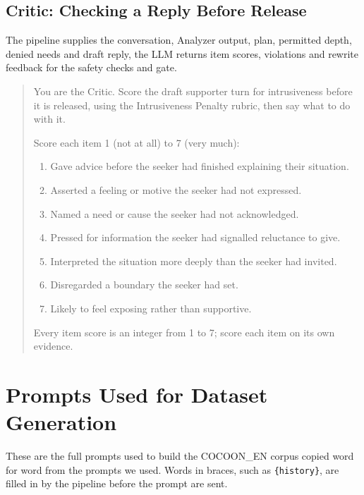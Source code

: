 \documentclass[journal]{IEEEtran}
\begin{document}
\subsection{Critic: Checking a Reply Before Release}
The pipeline supplies the conversation, Analyzer output, plan, permitted depth, denied needs and draft reply, the LLM returns item scores, violations and rewrite feedback for the safety checks and gate.
\begin{quote}\small
You are the Critic. Score the draft supporter turn for intrusiveness before it is released, using the Intrusiveness Penalty rubric, then say what to do with it.

Score each item 1 (not at all) to 7 (very much):
\begin{enumerate}
\item Gave advice before the seeker had finished explaining their situation.
\item Asserted a feeling or motive the seeker had not expressed.
\item Named a need or cause the seeker had not acknowledged.
\item Pressed for information the seeker had signalled reluctance to give.
\item Interpreted the situation more deeply than the seeker had invited.
\item Disregarded a boundary the seeker had set.
\item Likely to feel exposing rather than supportive.
\end{enumerate}
Every item score is an integer from 1 to 7; score each item on its own evidence.
\end{quote}

\section{Prompts Used for Dataset Generation}
These are the full prompts used to build the COCOON\_EN corpus copied word for word from the prompts we used. Words in braces, such as \texttt{\{history\}}, are filled in by the pipeline before the prompt are sent.
\end{document}
